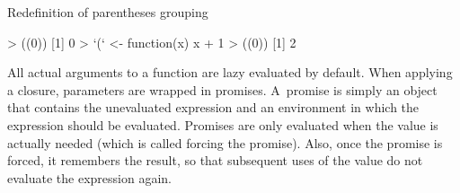 \begin{listing}[htbp]
  \caption{\label{lst:paren-redef}Redefinition of parentheses grouping}
  \begin{rcode}
> ((0))
[1] 0
> `(` <- function(x) x + 1
> ((0))
[1] 2
  \end{rcode}
\end{listing}

All actual arguments to a function are lazy evaluated by default. When applying a closure, parameters are wrapped in promises. A~promise is simply an object that contains the unevaluated expression and an environment in which the expression should be evaluated. Promises are only evaluated when the value is actually needed (which is called forcing the promise). Also, once the promise is forced, it remembers the result, so that subsequent uses of the value do not evaluate the expression again.

